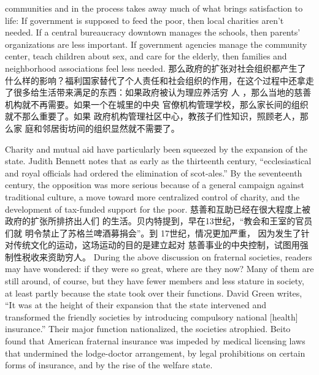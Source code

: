 \begin{paracol}{2}
communities and in the process takes away much of what
brings satisfaction to life: If government is supposed to feed the
poor, then local charities aren't needed. If a central bureaucracy
downtown manages the schools, then parents' organizations are
less important. If government agencies manage the community
center, teach children about sex, and care for the elderly, then
families and neighborhood associations feel less needed.
\switchcolumn
那么政府的扩张对社会组织都产生了什么样的影响？福利国家替代了个人责任和社会组织的作用，在这个过程中还拿走
了很多给生活带来满足的东西：如果政府被认为理应养活穷
人 ，那么当地的慈善机构就不再需要。如果一个在城里的中央
官僚机构管理学校，那么家长间的组织就不那么重要了。如果
政府机构管理社区中心，教孩子们性知识，照顾老人，那么家
庭和邻居街坊间的组织显然就不需要了。

Charity and mutual aid have particularly been squeezed by the
expansion of the state. Judith Bennett notes that as early as the
thirteenth century, ``ecclesiastical and royal officials had ordered
the elimination of scot-ales.'' By the seventeenth century, the
opposition was more serious because of a general campaign
against traditional culture, a move toward more centralized
control of charity, and the development of tax-funded support
for the poor.
\switchcolumn
慈善和互助已经在很大程度上被政府的扩张所排挤出人们
的生活。贝内特提到，早在13世纪，“教会和王室的官员们就
明令禁止了苏格兰啤酒募捐会”。到 17世纪，情况更加严重，
因为发生了针对传统文化的运动，这场运动的目的是建立起对
慈善事业的中央控制，试图用强制性税收来资助穷人。
\switchcolumn*
During the above discussion on fraternal societies, readers
may have wondered: if they were so great, where are they now?
Many of them are still around, of course, but they have fewer
members and less stature in society, at least partly because the
state took over their functions. David Green writes, ``It was at
the height of their expansion that the state intervened and
transformed the friendly societies by introducing compulsory
national [health] insurance.'' Their major function nationalized,
the societies atrophied. Beito found that American fraternal insurance was impeded by medical licensing laws that undermined the lodge-doctor arrangement, by legal prohibitions on
certain forms of insurance, and by the rise of the welfare state.

\end{paracol}
